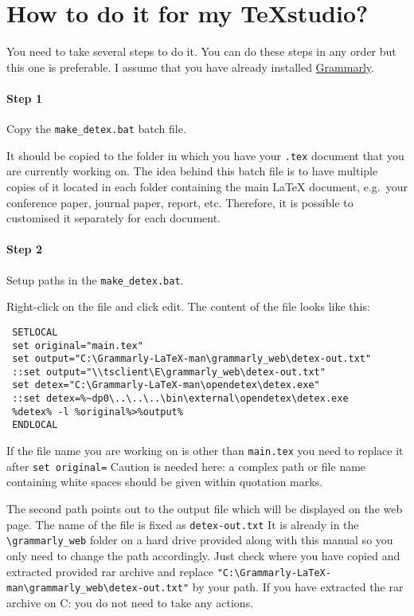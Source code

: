 \documentclass[]{spie}  %
\begin{document}
\section{How to do it for my TeXstudio?}
You need to take several steps to do it. You can do these steps in any order but this one is preferable. I assume that you have already installed \href{https://www.grammarly.com}{Grammarly}.
\paragraph{Step 1} Copy  the \verb|make_detex.bat| batch file. 

It should be copied to the folder in which you have your \verb|.tex| document that you are currently working on.
The idea behind this batch file is to have multiple copies of it located in each folder containing the main LaTeX document, e.g.\ your conference paper, journal paper, report, etc.
Therefore, it is possible to customised it separately for each document.

\paragraph{Step 2} Setup paths in the \verb|make_detex.bat|. 

Right-click on the file and click edit.
The content of the file looks like this:
 \begin{verbatim}
 SETLOCAL
 set original="main.tex"
 set output="C:\Grammarly-LaTeX-man\grammarly_web\detex-out.txt"
 ::set output="\\tsclient\E\grammarly_web\detex-out.txt"
 set detex="C:\Grammarly-LaTeX-man\opendetex\detex.exe"
 ::set detex=%~dp0\..\..\..\bin\external\opendetex\detex.exe
 %detex% -l %original%>%output%
 ENDLOCAL
 \end{verbatim}
If the file name you are working on is other than \verb|main.tex| you need to replace it after \verb|set original=|
Caution is needed here: a complex path or file name containing white spaces should be given within quotation marks.

The second path points out to the output file which will be displayed on the web page. The name of the file is fixed as \verb|detex-out.txt|
It is already in the \verb|\grammarly_web| folder on a hard drive provided along with this manual so you only need to change the path accordingly. 
Just check where you have copied and extracted provided rar archive and replace \verb|"C:\Grammarly-LaTeX-man\grammarly_web\detex-out.txt"| by your path. 
If you have extracted the rar archive on C: you do not need to take any actions.
\end{document}
